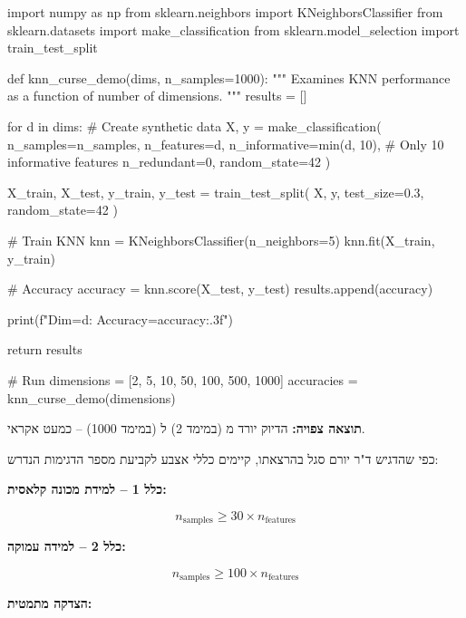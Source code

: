\begin{pythonbox}
import numpy as np
from sklearn.neighbors import KNeighborsClassifier
from sklearn.datasets import make_classification
from sklearn.model_selection import train_test_split

def knn_curse_demo(dims, n_samples=1000):
    """
    Examines KNN performance as a function of number of dimensions.
    """
    results = []

    for d in dims:
        # Create synthetic data
        X, y = make_classification(
            n_samples=n_samples,
            n_features=d,
            n_informative=min(d, 10),  # Only 10 informative features
            n_redundant=0,
            random_state=42
        )

        X_train, X_test, y_train, y_test = train_test_split(
            X, y, test_size=0.3, random_state=42
        )

        # Train KNN
        knn = KNeighborsClassifier(n_neighbors=5)
        knn.fit(X_train, y_train)

        # Accuracy
        accuracy = knn.score(X_test, y_test)
        results.append(accuracy)

        print(f"Dim={d}: Accuracy={accuracy:.3f}")

    return results

# Run
dimensions = [2, 5, 10, 50, 100, 500, 1000]
accuracies = knn_curse_demo(dimensions)
\end{pythonbox}

\textbf{תוצאה צפויה:} הדיוק יורד מ\en{-} (במימד \num{2}) ל\en{-} (במימד \num{1000}) – כמעט אקראי.


כפי שהדגיש ד"ר יורם סגל בהרצאתו, קיימים כללי אצבע לקביעת מספר הדגימות הנדרש:

\textbf{כלל \num{1} – למידת מכונה קלאסית:}

\begin{equation}
n_{\text{samples}} \geq \num{30} \times n_{\text{features}}
\end{equation}

\textbf{כלל \num{2} – למידה עמוקה:}

\begin{equation}
n_{\text{samples}} \geq \num{100} \times n_{\text{features}}
\end{equation}

\textbf{הצדקה מתמטית:}

